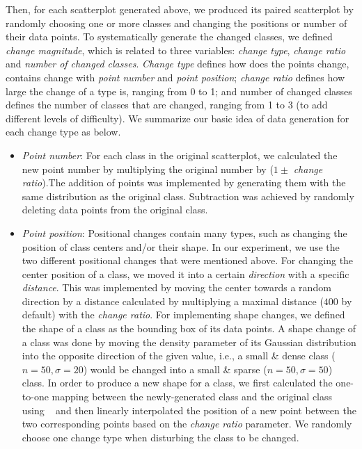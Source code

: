 Then, for each scatterplot generated above, we produced its paired scatterplot by randomly choosing one or more classes and changing the positions or number of their data points.
To systematically generate the changed classes, we defined \emph{change magnitude}, which is related to three variables: \emph{change type}, \emph{change ratio} and \emph{number of changed classes}.
\emph{Change type} defines how does the points change, contains change with \emph{point number} and \emph{point position};
\emph{change ratio} defines how large the change of a type is, ranging from 0 to 1; and {number of changed classes} defines the number of classes that are changed, ranging from 1 to 3 (to add
different levels of difficulty). We summarize our basic idea of data generation for each change type as below.
\begin{itemize}

     \item \emph{Point number}: For each class in the original scatterplot,  we calculated the new point number by multiplying the original number by ($1 \pm$ \emph{change ratio}).The addition of points was implemented by generating them with the same distribution as the original class. Subtraction was achieved by randomly deleting data points from the original class.

     \item \emph{Point position}: Positional changes contain many types, such as changing the position of class centers and/or their shape. In our experiment, we use the two different positional changes that were mentioned above. For changing the center position of a class, we  moved it into a certain \emph{direction} with a specific \emph{distance}.  This was implemented by moving the center towards a random direction by a distance calculated by multiplying a maximal distance ($400$ by default) with the \emph{change ratio}. For implementing shape changes, we defined the shape of a class as the bounding box of its data points. A shape change of a class was done by moving the density parameter of its Gaussian distribution into the opposite direction of the given value, i.e., a small \& dense class ($n=50, \sigma=20$) would be changed into a small \& sparse ($n=50, \sigma=50$) class. In order to produce a new shape for a class, we first calculated the one-to-one mapping between the newly-generated class and the original class using ~\cite{kuhn1955hungarian} and then linearly interpolated the position of a new point between the two corresponding points based on the \emph{change ratio} parameter. We randomly choose one change type when disturbing the class to be changed.
\end{itemize}
